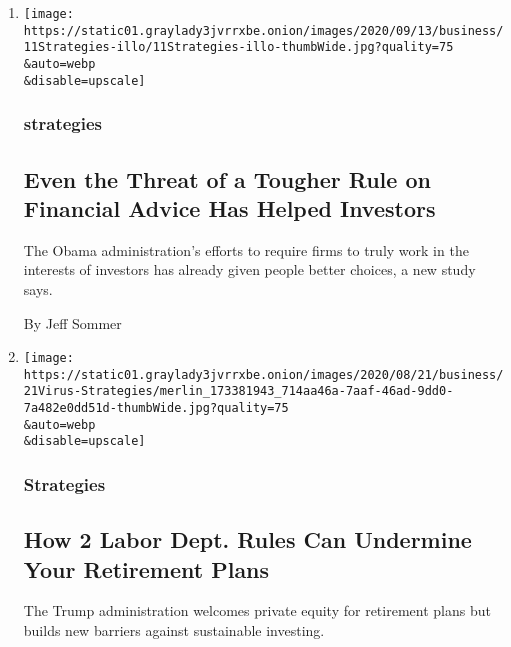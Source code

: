 \begin{enumerate}
\def\labelenumi{\arabic{enumi}.}
\item
  \href{/2020/09/11/business/investors-retirement-costs-threat.html}{}

  \texttt{[image: https://static01.graylady3jvrrxbe.onion/images/2020/09/13/business/11Strategies-illo/11Strategies-illo-thumbWide.jpg?quality=75\\\&auto=webp\\\&disable=upscale]}

  \hypertarget{strategies}{%
  \subsubsection{strategies}\label{strategies}}

  \hypertarget{even-the-threat-of-a-tougher-rule-on-financial-advice-has-helped-investors}{%
  \subsection{Even the Threat of a Tougher Rule on Financial Advice Has
  Helped
  Investors}\label{even-the-threat-of-a-tougher-rule-on-financial-advice-has-helped-investors}}

  The Obama administration's efforts to require firms to truly work in
  the interests of investors has already given people better choices, a
  new study says.

  By Jeff Sommer
\item
  \href{/2020/08/21/business/labor-department-proposal-retirement-planning.html}{}

  \texttt{[image: https://static01.graylady3jvrrxbe.onion/images/2020/08/21/business/21Virus-Strategies/merlin\_173381943\_714aa46a-7aaf-46ad-9dd0-7a482e0dd51d-thumbWide.jpg?quality=75\\\&auto=webp\\\&disable=upscale]}

  \hypertarget{strategies-1}{%
  \subsubsection{Strategies}\label{strategies-1}}

  \hypertarget{how-2-labor-dept-rules-can-undermine-your-retirement-plans}{%
  \subsection{How 2 Labor Dept. Rules Can Undermine Your Retirement
  Plans}\label{how-2-labor-dept-rules-can-undermine-your-retirement-plans}}

  The Trump administration welcomes private equity for retirement plans
  but builds new barriers against sustainable investing.


\end{enumerate}
